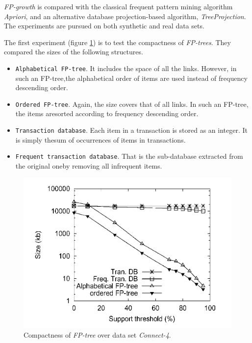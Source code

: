 \documentclass[12pt, a4paper]{article}
\newcommand{\code}[1]{\texttt{#1}}
\begin{document}
\textit{FP-growth} is compared with the classical frequent pattern mining algorithm \textit{Apriori}, and an alternative database projection-based algorithm, \textit{TreeProjection}. The experiments are pursued on both synthetic and real data sets.

The first experiment (figure \ref{fig:compactness}) is to test the compactness of \textit{FP-trees}. They compared the sizes of the following structures.

\begin{itemize}
  \item \code{Alphabetical FP-tree}. It includes the space of all the links. However, in such an FP-tree,the alphabetical order of items are used instead of frequency descending order.
  \item \code{Ordered FP-tree}. Again, the size covers that of all links. In such an FP-tree, the items aresorted according to frequency descending order.
  \item \code{Transaction database}. Each item in a transaction is stored as an integer. It is simply thesum of occurrences of items in transactions.
  \item \code{Frequent transaction database}. That is the sub-database extracted from the original oneby removing all infrequent items.
\end{itemize}

\begin{figure}[H]
  \includegraphics[scale=0.6]{fp-tree-compactness}
  \centering
  \caption{Compactness of \textit{FP-tree} over data set \textit{Connect-4}.}
  \label{fig:compactness}
\end{figure}
\end{document}
